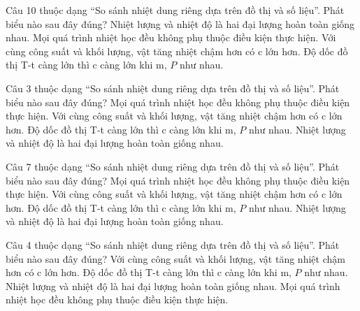 \begin{ex}
Câu 10 thuộc dạng “So sánh nhiệt dung riêng dựa trên đồ thị và số liệu”. Phát biểu nào sau đây đúng?
\choice
{Nhiệt lượng và nhiệt độ là hai đại lượng hoàn toàn giống nhau.}
{Mọi quá trình nhiệt học đều không phụ thuộc điều kiện thực hiện.}
{\True Với cùng công suất và khối lượng, vật tăng nhiệt chậm hơn có c lớn hơn.}
{Độ dốc đồ thị T-t càng lớn thì c càng lớn khi m, $P$ như nhau.}
\end{ex}

\begin{ex}
Câu 3 thuộc dạng “So sánh nhiệt dung riêng dựa trên đồ thị và số liệu”. Phát biểu nào sau đây đúng?
\choice
{Mọi quá trình nhiệt học đều không phụ thuộc điều kiện thực hiện.}
{\True Với cùng công suất và khối lượng, vật tăng nhiệt chậm hơn có c lớn hơn.}
{Độ dốc đồ thị T-t càng lớn thì c càng lớn khi m, $P$ như nhau.}
{Nhiệt lượng và nhiệt độ là hai đại lượng hoàn toàn giống nhau.}
\end{ex}

\begin{ex}
Câu 7 thuộc dạng “So sánh nhiệt dung riêng dựa trên đồ thị và số liệu”. Phát biểu nào sau đây đúng?
\choice
{Mọi quá trình nhiệt học đều không phụ thuộc điều kiện thực hiện.}
{\True Với cùng công suất và khối lượng, vật tăng nhiệt chậm hơn có c lớn hơn.}
{Độ dốc đồ thị T-t càng lớn thì c càng lớn khi m, $P$ như nhau.}
{Nhiệt lượng và nhiệt độ là hai đại lượng hoàn toàn giống nhau.}
\end{ex}

\begin{ex}
Câu 4 thuộc dạng “So sánh nhiệt dung riêng dựa trên đồ thị và số liệu”. Phát biểu nào sau đây đúng?
\choice
{\True Với cùng công suất và khối lượng, vật tăng nhiệt chậm hơn có c lớn hơn.}
{Độ dốc đồ thị T-t càng lớn thì c càng lớn khi m, $P$ như nhau.}
{Nhiệt lượng và nhiệt độ là hai đại lượng hoàn toàn giống nhau.}
{Mọi quá trình nhiệt học đều không phụ thuộc điều kiện thực hiện.}
\end{ex}

